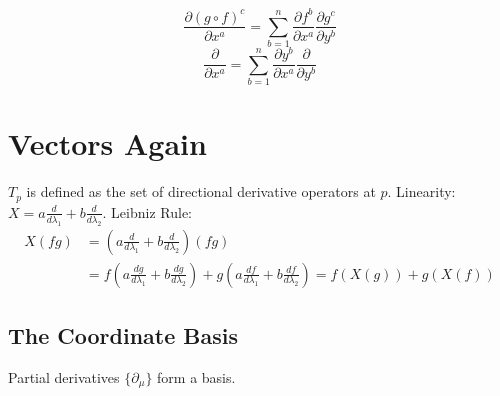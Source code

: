 \documentclass[11pt, a4paper]{report}
\begin{document}
\begin{equation} \frac{\partial (g \circ f)^c}{\partial x^a} = \sum_{b=1}^n \frac{\partial f^b}{\partial x^a} \frac{\partial g^c}{\partial y^b} \end{equation}
\begin{equation} \frac{\partial}{\partial x^a} = \sum_{b=1}^n \frac{\partial y^b}{\partial x^a} \frac{\partial}{\partial y^b} \end{equation}

\section{Vectors Again}


$T_p$ is defined as the set of directional derivative operators at $p$.
Linearity: $X = a \frac{d}{d\lambda_1} + b \frac{d}{d\lambda_2}$.
Leibniz Rule:
\begin{align*}
X(fg) &= \left(a \frac{d}{d\lambda_1} + b \frac{d}{d\lambda_2}\right) (fg) \\
&= f \left( a \frac{dg}{d\lambda_1} + b \frac{dg}{d\lambda_2} \right) + g \left( a \frac{df}{d\lambda_1} + b \frac{df}{d\lambda_2} \right) = f (X(g)) + g (X(f))
\end{align*}

\subsection*{The Coordinate Basis}
Partial derivatives $\{\partial_\mu\}$ form a basis.
\end{document}
